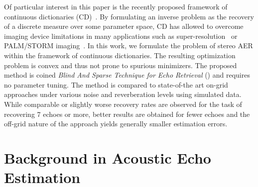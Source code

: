 Of particular interest in this paper is the recently proposed framework of continuous dictionaries (CD)~\cite{Carlos2014}.
By formulating an inverse problem as the recovery of a discrete measure over some parameter space, CD has allowed to overcome imaging device limitations in many applications such as super-resolution~\cite{Carlos2014} or PALM/STORM imaging~\cite{denoyelle2019}.
In this work, we formulate the problem of stereo AER within the framework of continuous dictionaries.
The resulting optimization problem is convex and thus not prone to spurious minimizers.
The proposed method is coined \emph{Blind And Sparse Technique for Echo Retrieval} (\blaster) and requires no parameter tuning.
The method is compared to state-of-the art on-grid approaches under various noise and reverberation levels using simulated data.
While comparable or slightly worse recovery rates are observed for the task of recovering 7 echoes or more, better results are obtained for fewer echoes and the off-grid nature of the approach yields generally smaller estimation errors.


\section{Background in Acoustic Echo Estimation}
\label{sec:blaster:background}

